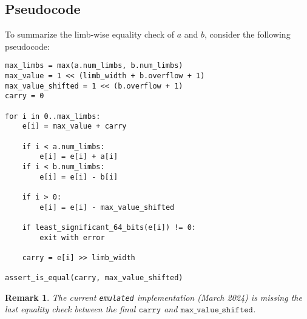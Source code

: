 \documentclass[a4paper, 12pt]{article}
\newtheorem*{remark}{Remark}
\begin{document}
\subsection{Pseudocode}%
\label{sec:pseudocode}
To summarize the limb-wise equality check of $a$ and $b$, consider the following pseudocode:

\begin{verbatim}
max_limbs = max(a.num_limbs, b.num_limbs)
max_value = 1 << (limb_width + b.overflow + 1)
max_value_shifted = 1 << (b.overflow + 1)
carry = 0

for i in 0..max_limbs:
    e[i] = max_value + carry

    if i < a.num_limbs:
        e[i] = e[i] + a[i]
    if i < b.num_limbs:
        e[i] = e[i] - b[i]

    if i > 0:
        e[i] = e[i] - max_value_shifted
    
    if least_significant_64_bits(e[i]) != 0:
        exit with error

    carry = e[i] >> limb_width

assert_is_equal(carry, max_value_shifted)
\end{verbatim}

\begin{remark}
The current \texttt{emulated} implementation (March 2024) is missing the last equality check between the final $\texttt{carry}$ and $\texttt{max\_value\_shifted}$.
\end{remark}
\end{document}
